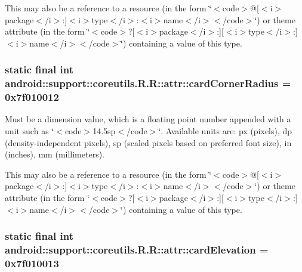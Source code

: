This may also be a reference to a resource (in the form \char`\"{}$<$code$>$@\mbox{[}$<$i$>$package$<$/i$>$:\mbox{]}$<$i$>$type$<$/i$>$:$<$i$>$name$<$/i$>$$<$/code$>$\char`\"{}) or theme attribute (in the form \char`\"{}$<$code$>$?\mbox{[}$<$i$>$package$<$/i$>$:\mbox{]}\mbox{[}$<$i$>$type$<$/i$>$:\mbox{]}$<$i$>$name$<$/i$>$$<$/code$>$\char`\"{}) containing a value of this type. \hypertarget{classandroid_1_1support_1_1coreutils_1_1_r_1_1attr_e229419d3dd0cd028285444a3c8a1428}{
\subsubsection[{cardCornerRadius}]{\setlength{\rightskip}{0pt plus 5cm}static final int android::support::coreutils.R.R::attr::cardCornerRadius = 0x7f010012}}
\label{classandroid_1_1support_1_1coreutils_1_1_r_1_1attr_e229419d3dd0cd028285444a3c8a1428}


Must be a dimension value, which is a floating point number appended with a unit such as \char`\"{}$<$code$>$14.5sp$<$/code$>$\char`\"{}. Available units are: px (pixels), dp (density-independent pixels), sp (scaled pixels based on preferred font size), in (inches), mm (millimeters). 

This may also be a reference to a resource (in the form \char`\"{}$<$code$>$@\mbox{[}$<$i$>$package$<$/i$>$:\mbox{]}$<$i$>$type$<$/i$>$:$<$i$>$name$<$/i$>$$<$/code$>$\char`\"{}) or theme attribute (in the form \char`\"{}$<$code$>$?\mbox{[}$<$i$>$package$<$/i$>$:\mbox{]}\mbox{[}$<$i$>$type$<$/i$>$:\mbox{]}$<$i$>$name$<$/i$>$$<$/code$>$\char`\"{}) containing a value of this type. \hypertarget{classandroid_1_1support_1_1coreutils_1_1_r_1_1attr_211a0269919c0dfd6afbc9f5218b7402}{
\subsubsection[{cardElevation}]{\setlength{\rightskip}{0pt plus 5cm}static final int android::support::coreutils.R.R::attr::cardElevation = 0x7f010013}}
\label{classandroid_1_1support_1_1coreutils_1_1_r_1_1attr_211a0269919c0dfd6afbc9f5218b7402}


